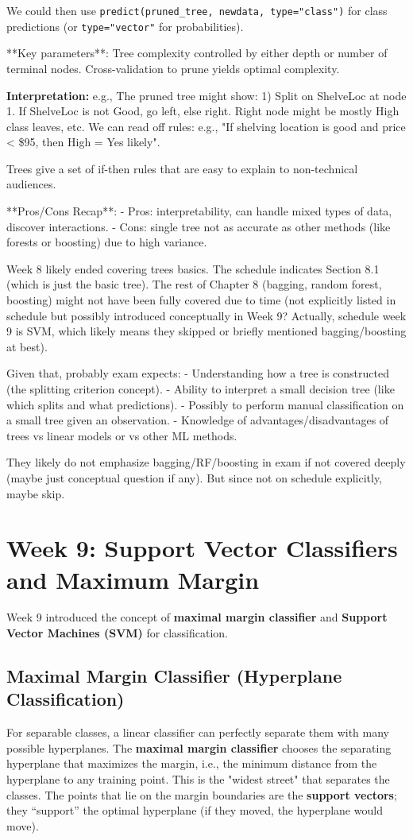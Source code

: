\documentclass[11pt]{article}
\begin{document}
We could then use \texttt{predict(pruned\_tree, newdata, type="class")} for class predictions (or \texttt{type="vector"} for probabilities).

**Key parameters**: Tree complexity controlled by either depth or number of terminal nodes. Cross-validation to prune yields optimal complexity.

\textbf{Interpretation:} e.g., The pruned tree might show: 
1) Split on ShelveLoc at node 1. If ShelveLoc is not Good, go left, else right. Right node might be mostly High class leaves, etc. 
We can read off rules: e.g., "If shelving location is good and price < \$95, then High = Yes likely".

Trees give a set of if-then rules that are easy to explain to non-technical audiences.

**Pros/Cons Recap**:
- Pros: interpretability, can handle mixed types of data, discover interactions.
- Cons: single tree not as accurate as other methods (like forests or boosting) due to high variance.

Week 8 likely ended covering trees basics. The schedule indicates Section 8.1 (which is just the basic tree). The rest of Chapter 8 (bagging, random forest, boosting) might not have been fully covered due to time (not explicitly listed in schedule but possibly introduced conceptually in Week 9? Actually, schedule week 9 is SVM, which likely means they skipped or briefly mentioned bagging/boosting at best).

Given that, probably exam expects:
- Understanding how a tree is constructed (the splitting criterion concept).
- Ability to interpret a small decision tree (like which splits and what predictions).
- Possibly to perform manual classification on a small tree given an observation.
- Knowledge of advantages/disadvantages of trees vs linear models or vs other ML methods.

They likely do not emphasize bagging/RF/boosting in exam if not covered deeply (maybe just conceptual question if any). But since not on schedule explicitly, maybe skip.

\section{Week 9: Support Vector Classifiers and Maximum Margin}
Week 9 introduced the concept of \textbf{maximal margin classifier} and \textbf{Support Vector Machines (SVM)} for classification.

\subsection{Maximal Margin Classifier (Hyperplane Classification)}
For separable classes, a linear classifier can perfectly separate them with many possible hyperplanes. The \textbf{maximal margin classifier} chooses the separating hyperplane that maximizes the margin, i.e., the minimum distance from the hyperplane to any training point. This is the "widest street" that separates the classes. The points that lie on the margin boundaries are the \textbf{support vectors}; they “support” the optimal hyperplane (if they moved, the hyperplane would move).
\end{document}
